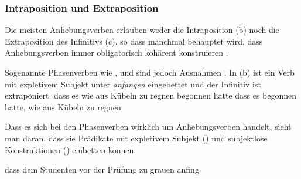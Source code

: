 \subsubsection{Intraposition und Extraposition}
\label{sec-subj-rais-ie}

Die meisten Anhebungsverben erlauben weder die Intraposition (b) noch
die Extraposition des Infinitivs (c), so dass manchmal behauptet wird, dass Anhebungsverben
immer obligatorisch kohärent konstruieren \citep[siehe z.\,B.][]{Haider90b}.
\eal
\label{bsp-intra-extra-scheinen}
\zl

\noindent
Sogenannte Phasenverben wie ,  und 
 sind jedoch Ausnahmen \citep[]{Kiss95a}. 
In (b) ist ein Verb mit expletivem Subjekt unter \emph{anfangen} eingebettet
und der Infinitiv ist extraponiert.
\eal
\ex
dass    es   wie aus Kübeln zu regnen begonnen hatte
\ex 
dass    es  begonnen hatte, wie aus Kübeln zu regnen
\zl

\noindent
Dass es sich bei den Phasenverben wirklich um Anhebungsverben handelt, sieht
man daran, dass sie Prädikate mit expletivem Subjekt () und subjektlose Konstruktionen ()
einbetten können.

\ea
dass dem Studenten vor der Prüfung zu grauen anfing
\z

